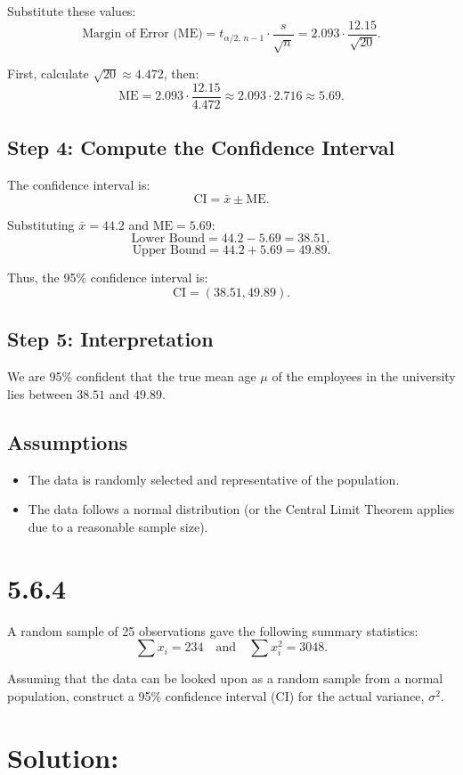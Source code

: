 \documentclass{article}
\begin{document}
Substitute these values:
\[
\text{Margin of Error (ME)} = t_{\alpha/2, \, n-1} \cdot \frac{s}{\sqrt{n}} = 2.093 \cdot \frac{12.15}{\sqrt{20}}.
\]

First, calculate \(\sqrt{20} \approx 4.472\), then:
\[
\text{ME} = 2.093 \cdot \frac{12.15}{4.472} \approx 2.093 \cdot 2.716 \approx 5.69.
\]

\subsection*{Step 4: Compute the Confidence Interval}
The confidence interval is:
\[
\text{CI} = \bar{x} \pm \text{ME}.
\]

Substituting \(\bar{x} = 44.2\) and \(\text{ME} = 5.69\):
\[
\text{Lower Bound} = 44.2 - 5.69 = 38.51,
\]
\[
\text{Upper Bound} = 44.2 + 5.69 = 49.89.
\]

Thus, the 95\% confidence interval is:
\[
\text{CI} = (38.51, 49.89).
\]

\subsection*{Step 5: Interpretation}
We are 95\% confident that the true mean age \(\mu\) of the employees in the university lies between \(38.51\) and \(49.89\).

\subsection*{Assumptions}
\begin{itemize}
    \item The data is randomly selected and representative of the population.
    \item The data follows a normal distribution (or the Central Limit Theorem applies due to a reasonable sample size).
\end{itemize}

\section*{5.6.4}


A random sample of 25 observations gave the following summary statistics:
\[
\sum x_i = 234 \quad \text{and} \quad \sum x_i^2 = 3048.
\]

Assuming that the data can be looked upon as a random sample from a normal population, construct a 95\% confidence interval (CI) for the actual variance, \(\sigma^2\).

\section*{Solution:}
\end{document}
